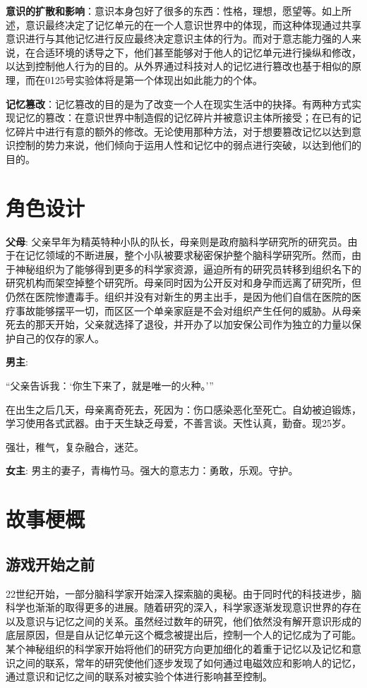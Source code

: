 \documentclass[12pt, a4paper]{article}
\begin{document}
        \medskip
        \textbf{意识的扩散和影响}：意识本身包好了很多的东西：性格，理想，愿望等。如上所述，意识最终决定了记忆单元的在一个人意识世界中的体现，而这种体现通过共享意识进行与其他记忆进行反应最终决定意识主体的行为。而对于意志能力强的人来说，在合适环境的诱导之下，他们甚至能够对于他人的记忆单元进行操纵和修改，以达到控制他人行为的目的。从外界通过科技对人的记忆进行篡改也基于相似的原理，而在0125号实验体将是第一个体现出如此能力的个体。

        \medskip
        \textbf{记忆篡改}：记忆篡改的目的是为了改变一个人在现实生活中的抉择。有两种方式实现记忆的篡改：在意识世界中制造假的记忆碎片并被意识主体所接受；在已有的记忆碎片中进行有意的额外的修改。无论使用那种方法，对于想要篡改记忆以达到意识控制的势力来说，他们倾向于运用人性和记忆中的弱点进行突破，以达到他们的目的。
            

    \newpage        
    \section*{角色设计}

        \textbf{父母}:
            父亲早年为精英特种小队的队长，母亲则是政府脑科学研究所的研究员。由于在记忆领域的不断进展，整个小队被要求秘密保护整个脑科学研究所。然而，由于神秘组织为了能够得到更多的科学家资源，逼迫所有的研究员转移到组织名下的研究机构而架空掉整个研究所。母亲同时因为公开反对和身孕而远离了研究所，但仍然在医院惨遭毒手。组织并没有对新生的男主出手，是因为他们自信在医院的医疗事故能够摆平一切，而区区一个单亲家庭是不会对组织产生任何的威胁。从母亲死去的那天开始，父亲就选择了退役，并开办了以加安保公司作为独立的力量以保护自己的仅存的家人。 

        \textbf{男主}:

            “父亲告诉我：‘你生下来了，就是唯一的火种。’” 
            
            在出生之后几天，母亲离奇死去，死因为：伤口感染恶化至死亡。自幼被迫锻炼，学习使用各式武器。由于天生缺乏母爱，不善言谈。天性认真，勤奋。现25岁。

            强壮，稚气，复杂融合，迷茫。

        \medskip
        \textbf{女主}:  
            男主的妻子，青梅竹马。强大的意志力：勇敢，乐观。守护。 
            
    \newpage 
    \section*{故事梗概}
    \subsection*{游戏开始之前}
        22世纪开始，一部分脑科学家开始深入探索脑的奥秘。由于同时代的科技进步，脑科学也渐渐的取得更多的进展。随着研究的深入，科学家逐渐发现意识世界的存在以及意识与记忆之间的关系。虽然经过数年的研究，他们依然没有解开意识形成的底层原因，但是自从记忆单元这个概念被提出后，控制一个人的记忆成为了可能。某个神秘组织的科学家开始将他们的研究方向更加细化的着重于记忆以及记忆和意识之间的联系，常年的研究使他们逐步发现了如何通过电磁效应和影响人的记忆，通过意识和记忆之间的联系对被实验个体进行影响甚至控制。
\end{document}
